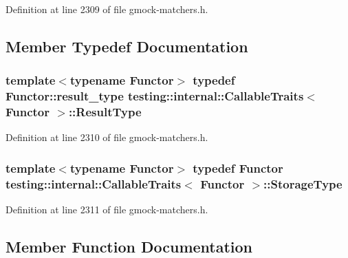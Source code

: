 Definition at line 2309 of file gmock-\/matchers.\+h.



\subsection{Member Typedef Documentation}
\subsubsection[{\texorpdfstring{Result\+Type}{ResultType}}]{\setlength{\rightskip}{0pt plus 5cm}template$<$typename Functor$>$ typedef Functor\+::result\+\_\+type {\bf testing\+::internal\+::\+Callable\+Traits}$<$ Functor $>$\+::{\bf Result\+Type}}\hypertarget{structtesting_1_1internal_1_1_callable_traits_a242d198dd1c56a153ba931d7166ec7f3}{}\label{structtesting_1_1internal_1_1_callable_traits_a242d198dd1c56a153ba931d7166ec7f3}


Definition at line 2310 of file gmock-\/matchers.\+h.

\subsubsection[{\texorpdfstring{Storage\+Type}{StorageType}}]{\setlength{\rightskip}{0pt plus 5cm}template$<$typename Functor$>$ typedef Functor {\bf testing\+::internal\+::\+Callable\+Traits}$<$ Functor $>$\+::{\bf Storage\+Type}}\hypertarget{structtesting_1_1internal_1_1_callable_traits_a23cc0c86a3bd18b2f8dd159dd44e1168}{}\label{structtesting_1_1internal_1_1_callable_traits_a23cc0c86a3bd18b2f8dd159dd44e1168}


Definition at line 2311 of file gmock-\/matchers.\+h.



\subsection{Member Function Documentation}
